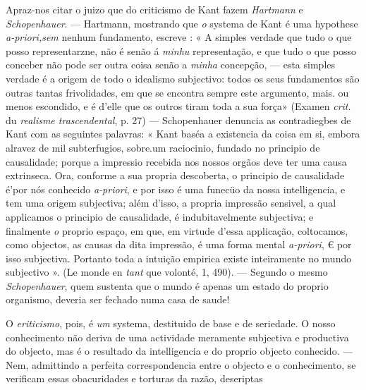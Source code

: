 Apraz-nos citar o juizo que do criticismo de Kant fazem \emph{Hartmann} e \emph{Schopenhauer}. --- Hartmann, mostrando que \emph{o} systema de Kant é uma hypothese \emph{a-priori,sem} nenhum fundamento, escreve : « A simples verdade que tudo o que posso representarzne, não é senão á \emph{minhu} representação, e que tudo o que posso conceber não pode ser outra coisa senão a \emph{minha} concepção, --- esta simples verdade é a origem de todo o idealismo subjectivo: todos os seus fundamentos são outras tantas frivolidades, em que se encontra sempre este argumento, mais. ou menos escondido, e é d'elle que os outros tiram toda a sua força» (Examen \emph{crit}. du \emph{realisme trascendental}, p. 27) --- Schopenhauer denuncia as contradiegbes de Kant com as seguintes palavras: « Kant baséa a existencia da coisa em si, embora alravez de mil subterfugios, sobre.um raciocinio, fundado no principio de causalidade; porque a impressio recebida nos nossos orgãos deve ter uma causa extrinseca. Ora, conforme a sua propria descoberta, o principio de causalidade é'por nós conhecido \emph{a-priori}, e por isso é uma funecüo da nossa intelligencia, e tem uma origem subjectiva; além d'isso, a propria impressão sensivel, a qual applicamos o principio de causalidade, é indubitavelmente subjectiva; e finalmente \emph{o} proprio espaço, em que, em virtude d'essa applicação, coltocamos, como objectos, as causas da dita impressão, é uma forma mental \emph{a-priori}, € por isso subjectiva. Portanto toda a intuição empirica existe inteiramente no mundo subjectivo ». (Le monde en \emph{tant} que volonté, 1, 490). --- Segundo o mesmo \emph{Schopenhauer}, quem sustenta que o mundo é apenas um estado do proprio organismo, deveria ser fechado numa casa de saude!

O \emph{eriticismo}, pois, é \emph{um} systema, destituido de base e de seriedade. O nosso conhecimento não deriva de uma actividade meramente subjectiva e productiva do objecto, mas é o resultado da intelligencia e do proprio objecto conhecido. --- Nem, admittindo a perfeita correspondencia entre o objecto e o conhecimento, se verificam essas obacuridades e torturas da razão, deseriptas


